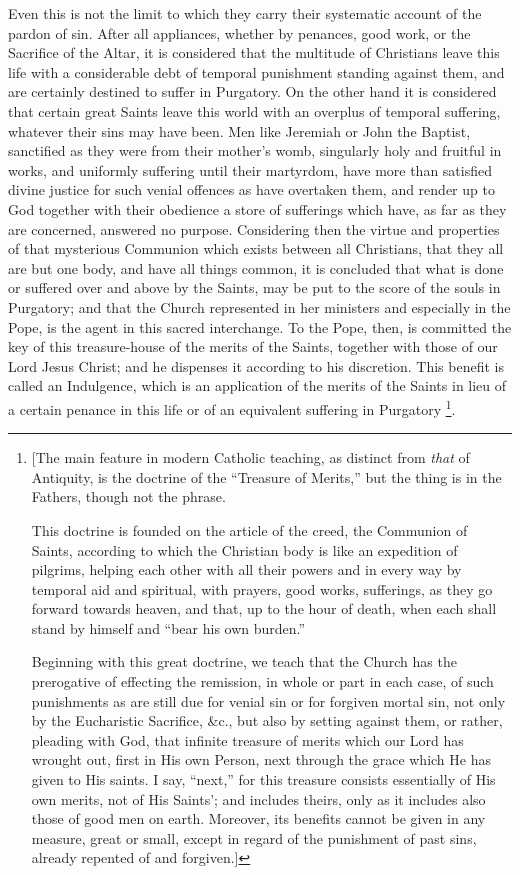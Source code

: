 Even this is not the limit to which they carry their systematic
account of the pardon of sin. After all appliances, whether by
penances, good work, or the Sacrifice of the Altar, it is considered
that the multitude of Christians leave this life with a considerable
debt of temporal punishment standing against them, and are certainly
destined to suffer in Purgatory. On the other hand it is considered
that certain great Saints leave this world with an overplus of
temporal suffering, whatever their sins may have been. Men like
Jeremiah or John the Baptist, sanctified as they were from their
mother's womb, singularly holy and fruitful in works, and uniformly
suffering until their martyrdom, have more than satisfied divine
justice for such venial offences as have overtaken them, and render up
to God together with their obedience a store of sufferings which have,
as far as they are concerned, answered no purpose. Considering then
the virtue and properties of that mysterious Communion which exists
between all Christians, that they all are but one body, and have all
things common, it is concluded that what is done or suffered over and
above by the Saints, may be put to the score of the souls in
Purgatory; and that the Church represented in her ministers and
especially in the Pope, is the agent in this sacred interchange. To
the Pope, then, is committed the key of this treasure-house of the
merits of the Saints, together with those of our Lord Jesus Christ;
and he dispenses it according to his discretion. This benefit is
called an Indulgence, which is an application of the merits of the
Saints in lieu of a certain penance in this life or of an equivalent
suffering in Purgatory \footnote{[The main feature in modern Catholic
teaching, as distinct from \emph{that} of Antiquity, is the doctrine
of the ``Treasure of Merits,'' but the thing is in the
Fathers, though not the phrase.

This doctrine is founded on the article of the creed, the Communion
of Saints, according to which the Christian body is like an expedition
of pilgrims, helping each other with all their powers and in every way
by temporal aid and spiritual, with prayers, good works, sufferings,
as they go forward towards heaven, and that, up to the hour of death,
when each shall stand by himself and ``bear his own burden.''

Beginning with this great doctrine, we teach that the Church has
the prerogative of effecting the remission, in whole or part in each
case, of such punishments as are still due for venial sin or for
forgiven mortal sin, not only by the Eucharistic Sacrifice, \&c.,
but also by setting against them, or rather, pleading with God, that
infinite treasure of merits which our Lord has wrought out, first in
His own Person, next through the grace which He has given to His
saints. I say, ``next,'' for this treasure consists
essentially of His own merits, not of His Saints'; and includes
theirs, only as it includes also those of good men on earth. Moreover,
its benefits cannot be given in any measure, great or small, except in
regard of the punishment of past sins, already repented of and
forgiven.]}.

